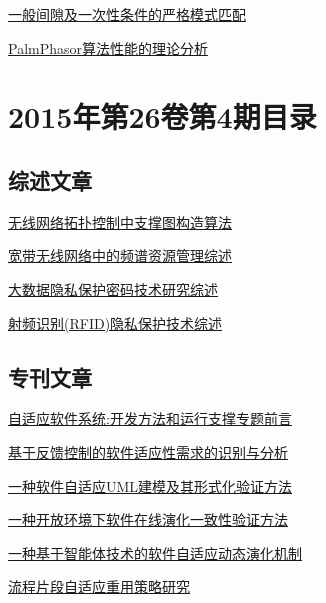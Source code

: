 \documentclass[a4paper]{article}
\begin{document}
\href{http://www.jos.org.cn/ch/reader/download_pdf.aspx?file_no=4707&year_id=2015&quarter_id=5&falg=1}{一般间隙及一次性条件的严格模式匹配}

\href{http://www.jos.org.cn/ch/reader/download_pdf.aspx?file_no=4594&year_id=2015&quarter_id=5&falg=1}{PalmPhasor算法性能的理论分析}


\section{\textbf{2015年第26卷第4期目录}}
\subsection{综述文章}
\href{http://www.jos.org.cn/ch/reader/download_pdf.aspx?file_no=4740&year_id=2015&quarter_id=4&falg=1}{无线网络拓扑控制中支撑图构造算法}

\href{http://www.jos.org.cn/ch/reader/download_pdf.aspx?file_no=4812&year_id=2015&quarter_id=4&falg=1}{宽带无线网络中的频谱资源管理综述}

\href{http://www.jos.org.cn/ch/reader/download_pdf.aspx?file_no=4794&year_id=2015&quarter_id=4&falg=1}{大数据隐私保护密码技术研究综述}

\href{http://www.jos.org.cn/ch/reader/download_pdf.aspx?file_no=4804&year_id=2015&quarter_id=4&falg=1}{射频识别(RFID)隐私保护技术综述}

\subsection{专刊文章}
\href{http://www.jos.org.cn/ch/reader/download_pdf.aspx?file_no=4762&year_id=2015&quarter_id=4&falg=1}{自适应软件系统:开发方法和运行支撑专题前言}

\href{http://www.jos.org.cn/ch/reader/download_pdf.aspx?file_no=4755&year_id=2015&quarter_id=4&falg=1}{基于反馈控制的软件适应性需求的识别与分析}

\href{http://www.jos.org.cn/ch/reader/download_pdf.aspx?file_no=4758&year_id=2015&quarter_id=4&falg=1}{一种软件自适应UML建模及其形式化验证方法}

\href{http://www.jos.org.cn/ch/reader/download_pdf.aspx?file_no=4751&year_id=2015&quarter_id=4&falg=1}{一种开放环境下软件在线演化一致性验证方法}

\href{http://www.jos.org.cn/ch/reader/download_pdf.aspx?file_no=4757&year_id=2015&quarter_id=4&falg=1}{一种基于智能体技术的软件自适应动态演化机制}

\href{http://www.jos.org.cn/ch/reader/download_pdf.aspx?file_no=4759&year_id=2015&quarter_id=4&falg=1}{流程片段自适应重用策略研究}
\end{document}
